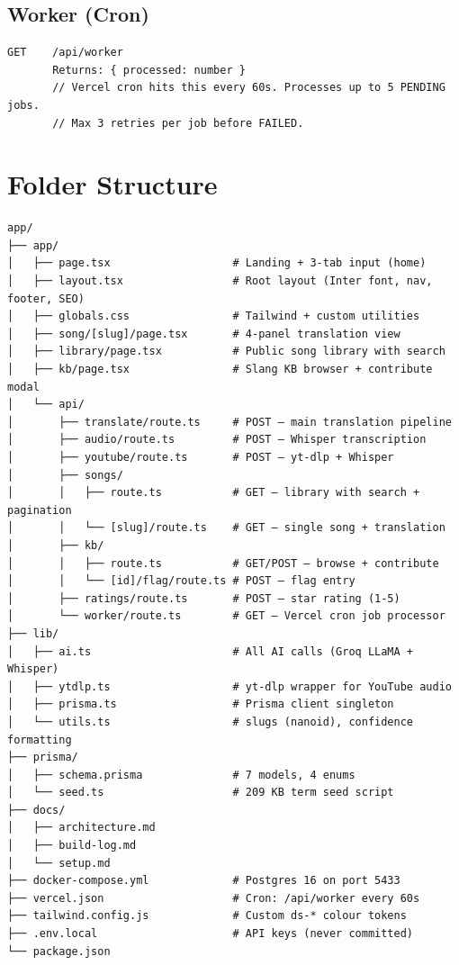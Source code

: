 \documentclass[12pt, a4paper]{article}
\begin{document}
\subsection{Worker (Cron)}

\begin{tcolorbox}[codebox]
\begin{lstlisting}
GET    /api/worker
       Returns: { processed: number }
       // Vercel cron hits this every 60s. Processes up to 5 PENDING jobs.
       // Max 3 retries per job before FAILED.
\end{lstlisting}
\end{tcolorbox}

\section{Folder Structure}

\begin{tcolorbox}[codebox]
\begin{lstlisting}
app/
├── app/
│   ├── page.tsx                   # Landing + 3-tab input (home)
│   ├── layout.tsx                 # Root layout (Inter font, nav, footer, SEO)
│   ├── globals.css                # Tailwind + custom utilities
│   ├── song/[slug]/page.tsx       # 4-panel translation view
│   ├── library/page.tsx           # Public song library with search
│   ├── kb/page.tsx                # Slang KB browser + contribute modal
│   └── api/
│       ├── translate/route.ts     # POST — main translation pipeline
│       ├── audio/route.ts         # POST — Whisper transcription
│       ├── youtube/route.ts       # POST — yt-dlp + Whisper
│       ├── songs/
│       │   ├── route.ts           # GET — library with search + pagination
│       │   └── [slug]/route.ts    # GET — single song + translation
│       ├── kb/
│       │   ├── route.ts           # GET/POST — browse + contribute
│       │   └── [id]/flag/route.ts # POST — flag entry
│       ├── ratings/route.ts       # POST — star rating (1-5)
│       └── worker/route.ts        # GET — Vercel cron job processor
├── lib/
│   ├── ai.ts                      # All AI calls (Groq LLaMA + Whisper)
│   ├── ytdlp.ts                   # yt-dlp wrapper for YouTube audio
│   ├── prisma.ts                  # Prisma client singleton
│   └── utils.ts                   # slugs (nanoid), confidence formatting
├── prisma/
│   ├── schema.prisma              # 7 models, 4 enums
│   └── seed.ts                    # 209 KB term seed script
├── docs/
│   ├── architecture.md
│   ├── build-log.md
│   └── setup.md
├── docker-compose.yml             # Postgres 16 on port 5433
├── vercel.json                    # Cron: /api/worker every 60s
├── tailwind.config.js             # Custom ds-* colour tokens
├── .env.local                     # API keys (never committed)
└── package.json
\end{lstlisting}
\end{tcolorbox}
\end{document}
